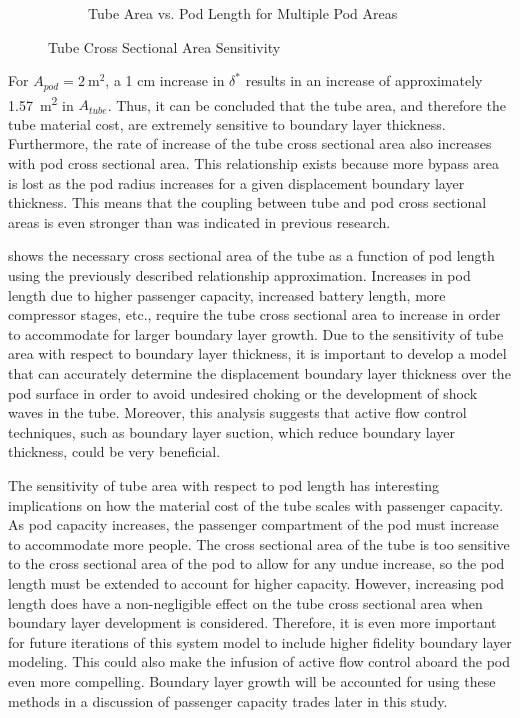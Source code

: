 \begin{figure}
\begin{subfigure}{.5\textwidth}
  \caption{Tube Area vs. Pod Length for Multiple Pod Areas}
  \label{fig:tube_area_vs_length}
\end{subfigure}
\caption{Tube Cross Sectional Area Sensitivity}
\label{fig:topTubeArea}
\end{figure}

For $A_{pod} = \SI{2}{\metre\squared}$, a 1 cm increase in $\delta^{*}$
results in an increase of approximately \SI{1.57}{\metre\squared} in $A_{tube}$.
Thus, it can be concluded that the tube area, and therefore the tube material cost,
are extremely sensitive to boundary layer thickness. Furthermore, the rate of
increase of the tube cross sectional area also increases with pod cross sectional area.
This relationship exists because more bypass area is lost as the pod radius
increases for a given displacement boundary layer thickness. This means that
the coupling between tube and pod cross sectional areas is even stronger than
was indicated in previous research.

 shows the necessary cross sectional area of the
tube as a function of pod length using the previously described relationship
approximation. Increases in pod length due to higher passenger
capacity, increased battery length, more compressor stages, etc., require the
tube cross sectional area to increase in order to accommodate for larger
boundary layer growth.
Due to the sensitivity of tube area with respect to boundary layer thickness,
it is important to develop a model that can accurately determine the
displacement boundary layer thickness over the pod surface in order to avoid
undesired choking or the development of shock waves in the tube. Moreover,
this analysis suggests that active flow control techniques, such as boundary
layer suction, which reduce boundary layer thickness, could be very beneficial.

The sensitivity of tube area with respect to pod length has interesting
implications on how the material cost of the tube scales with passenger capacity.
As pod capacity increases, the passenger compartment of the pod must increase
to accommodate more people. The cross sectional area of the tube is too
sensitive to the cross sectional area of the pod to allow for any undue
increase, so the pod length must be extended to account for higher capacity.
However, increasing pod length does have a non-negligible effect on the tube
cross sectional area when boundary layer development is considered. Therefore,
it is even more important for future iterations of this system model to include
higher fidelity boundary layer modeling. This could also make the infusion of
active flow control aboard the pod even more compelling. Boundary layer growth
will be accounted for using these methods in a discussion of passenger capacity
trades later in this study.
